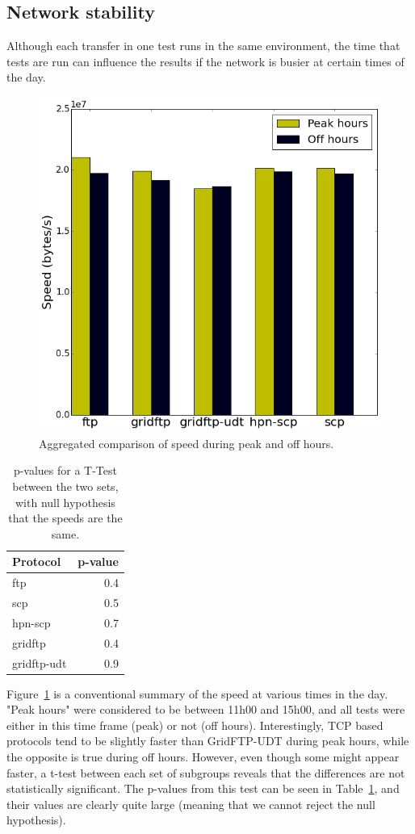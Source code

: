 \documentclass{sig-alternate-05-2015}
\begin{document}
\subsection{Network stability}
Although each transfer in one test runs in the same environment, the time that tests are run can influence the results if the network is busier at certain times of the day.

\begin{figure}[h]
\centering
\includegraphics[width=.8\linewidth]{img/peak.png}
\caption{Aggregated comparison of speed during peak and off hours.}
\label{fig:peak}
\end{figure}

\begin{table}[h]
\centering
	\begin{tabular}{lr}
	\toprule
	Protocol &  p-value \\
	\midrule
	ftp         &      0.4 \\
	scp         &      0.5 \\
	hpn-scp     &      0.7 \\
	gridftp     &      0.4 \\
	gridftp-udt &      0.9 \\
	\bottomrule
	\end{tabular}
\caption{p-values for a T-Test between the two sets, with null hypothesis that the speeds are the same.}
\label{tab:pval}
\end{table}

Figure~\ref{fig:peak} is a conventional summary of the speed at various times in the day. "Peak hours" were considered to be between 11h00 and 15h00, and all tests were either in this time frame (peak) or not (off hours). Interestingly, TCP based protocols tend to be slightly faster than GridFTP-UDT during peak hours, while the opposite is true during off hours. However, even though some might appear faster, a t-test between each set of subgroups reveals that the differences are not statistically significant. The p-values from this test can be seen in Table~\ref{tab:pval}, and their values are clearly quite large (meaning that we cannot reject the null hypothesis).
\end{document}
